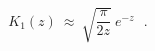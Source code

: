 \begin{equation}
{\mathit {K}}_{1}(z)~ \approx ~\sqrt {\frac {\pi}{2z}} ~ e^{-z} ~~~.
\end{equation}

